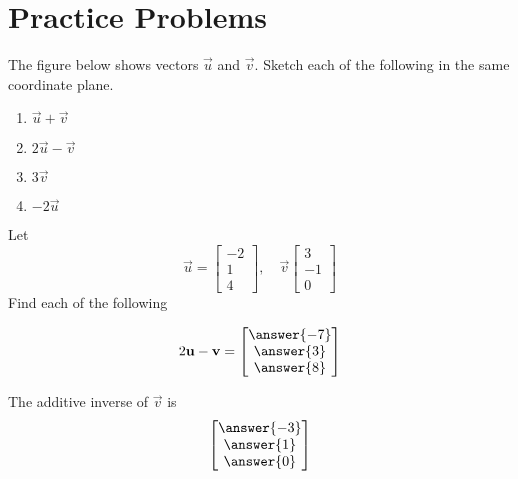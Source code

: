 \documentclass{ximera}
\begin{document}
\section*{Practice Problems}
 
 \begin{problem}\label{prob:sketchsumdiff}
The figure below shows vectors $\vec{u}$ and $\vec{v}$.  Sketch each of the following in the same coordinate plane.
 
\begin{center}
\end{center}
 \begin{enumerate}
  \item 
  $\vec{u}+\vec{v}$
  \item
  $2\vec{u}-\vec{v}$
  \item 
  $3\vec{v}$
  \item
  $-2\vec{u}$
  \end{enumerate}
\end{problem}

\begin{problem}%
Let $$\vec{u}=\begin{bmatrix}-2\\1\\4\end{bmatrix},\quad\vec{v}\begin{bmatrix}3\\-1\\0\end{bmatrix}$$
Find each of the following
\begin{problem}\label{prob:evaluatevectsumdiff1}
$$2\vec{u}-\vec{v}=\begin{bmatrix}\answer{-7}\\\answer{3}\\\answer{8}\end{bmatrix}$$
\end{problem}
\begin{problem} \label{prob:evaluatevectsumdiff2}The additive inverse of $\vec{v}$ is
$$\begin{bmatrix}\answer{-3}\\\answer{1}\\\answer{0}\end{bmatrix}$$
\end{problem}
\end{problem}
\end{document}
